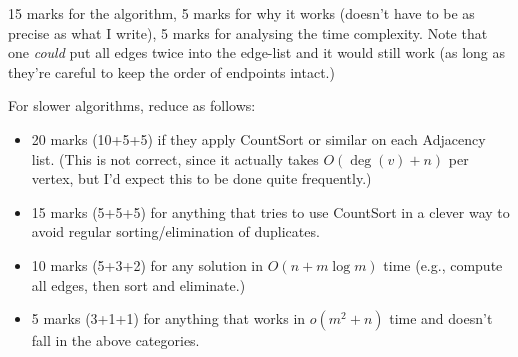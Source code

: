 \begin{markingScheme}
15 marks for the algorithm, 5 marks for why it works (doesn't have to be
as precise as what I write), 5 marks for analysing the time complexity.
Note that one {\em could} put all edges twice into the edge-list and it
would still work (as long as they're careful to keep the order of endpoints
intact.)

For slower algorithms, reduce as follows:
\begin{itemize}
\item 20 marks (10+5+5) if they apply CountSort or similar on each Adjacency
	list.
	(This is not correct, since it actually takes $O(\deg(v)+n)$ per vertex,
	but I'd expect this to be done quite frequently.)
\item 15 marks (5+5+5) for anything that tries to use CountSort in a clever way
	to avoid regular sorting/elimination of duplicates.
\item 10 marks (5+3+2) for any solution in $O(n+m\log m)$ time
	(e.g., compute all edges, then sort and eliminate.)
\item 5 marks (3+1+1) for anything that works in $o(m^2+n)$ time and
	doesn't fall in the above categories.
\end{itemize}
\end{markingScheme}
